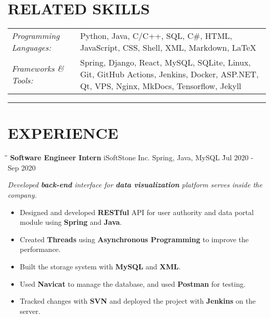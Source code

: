 \documentclass{res}
\begin{document}
\begin{resume}
\vspace{-0.2in}
\section{RELATED SKILLS}  
    \vspace{+0.15in}
    \hspace{-0.12in} 
    \begin{tabular}{l p{4.6in}}
    {\sl Programming Languages:} & Python, Java, C/C++, SQL, C\#, HTML, JavaScript, CSS, 
                        Shell, XML, Markdown, LaTeX \\ 
    \rule{0in}{0.2in}
    {\sl Frameworks \& Tools:} & Spring, Django, React, MySQL, SQLite, Linux, Git, 
                        GitHub Actions, Jenkins, Docker, ASP.NET, Qt, VPS, Nginx, 
                        MkDocs, Tensorflow, Jekyll
    \end{tabular}   

\vspace{-5pt}
\hspace{-0.55in}
\noindent\rule[0.25\baselineskip]{19.36cm}{0.5pt}    

\vspace{-0.2in}
\section{EXPERIENCE}
    \vspace{-0.05in}	
    \begin{tabbing}
    \hspace{2.6in}\= \hspace{1.5in}\= \hspace{1.6in}\= \kill %
    {\bf Software Engineer Intern} \> iSoftStone Inc. \>  
                                        Spring, Java, MySQL    \` Jul 2020 - Sep 2020\\
    \end{tabbing}\vspace{-20pt}      %
    \vspace{-0.15in}
    \textit{Developed {\bf back-end} interface for {\bf data visualization} 
                platform serves inside the company.}
    \vspace{+0.05in}
    \begin{itemize} \itemsep 0.5pt %
        \item Designed and developed {\bf RESTful} API for user authority and 
                data portal module using {\bf Spring} and {\bf Java}.
        \item Created {\bf Threads} using {\bf Asynchronous Programming} to 
                improve the performance.
        \item Built the storage system with {\bf MySQL} and {\bf XML}.
        \item Used {\bf Navicat} to manage the database, and used {\bf Postman} for testing.
        \item Tracked changes with {\bf SVN} and deployed the project with {\bf Jenkins} 
                on the server.
    \end{itemize}


\end{resume}
\end{document}
